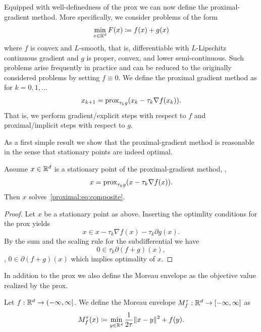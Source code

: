 Equipped with well-definedness of the prox we can now define the proximal-gradient method. More specifically, we consider problems of the form 
\begin{equation}\label{proximal:eq:composite}
    \min_{x\in \mathbb{R}^d} F(x)\coloneqq f(x) + g(x)
\end{equation}
where $f$ is convex and $L$-smooth, that is, differentiable with $L$-Lipschitz continuous gradient and $g$ is proper, convex, and lower semi-continuous. Such problems arise frequently in practice and can be reduced to the originally considered problems by setting $f\equiv 0$. We define the proximal gradient method as for $k=0,1,\dots$
\begin{equation}\label{proximal:eq:prox_grad}
    \begin{aligned}
        x_{k+1} = \mathrm{prox}_{\tau_k g}(x_k - \tau_k \nabla f(x_k)).
    \end{aligned}
\end{equation}
That is, we perform gradient/explicit steps with respect to $f$ and proximal/implicit steps with respect to $g$.

As a first simple result we show that the proximal-gradient method is reasonable in the sense that stationary points are indeed optimal. 
\begin{lemma}
    Assume $x\in\mathbb{R}^d$ is a stationary point of the proximal-gradient method, \ie, 
    \begin{equation}
        x = \mathrm{prox}_{\tau_k g}(x - \tau_k \nabla f(x)).
    \end{equation}
    Then $x$ solves~\eqref{proximal:eq:composite}.
\end{lemma}
\begin{proof}
    Let $x$ be a stationary point as above. Inserting the optimlity conditions for the prox yields
    \begin{equation}
        x \in x - \tau_k \nabla f(x) - \tau_k \partial g(x).
    \end{equation}
    By the sum and the scaling rule for the subdifferential we have
    \begin{equation}
        0 \in \tau_k \partial (f + g)(x),
    \end{equation}
    \ie, $0 \in \partial (f+g)(x)$ which implies optimality of $x$.
\end{proof}

In addition to the prox we also define the Moreau envelope as the objective value realized by the prox.
\begin{defn}
    Let $f:\mathbb{R}^d\rightarrow (-\infty,\infty]$. We define the Moreau envelope $M_f^\tau:\mathbb{R}^d\rightarrow [-\infty,\infty]$ as 
    \begin{equation}
        M_f^\tau(x) \coloneq \min_{y\in \mathbb{R}^d}\frac{1}{2\tau} \|x-y\|^2 + f(y).
    \end{equation}
\end{defn}

